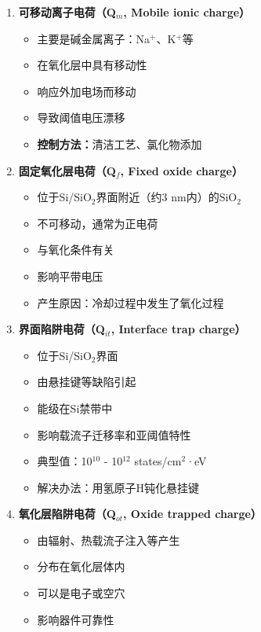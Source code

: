 \documentclass[UTF8,12pt,a4paper]{ctexart}
\begin{document}
\begin{enumerate}
    \item \textbf{可移动离子电荷（Q$_m$, Mobile ionic charge）}
    \begin{itemize}
        \item 主要是碱金属离子：Na$^+$、K$^+$等
        \item 在氧化层中具有移动性
        \item 响应外加电场而移动
        \item 导致阈值电压漂移
        \item \textbf{控制方法：}清洁工艺、氯化物添加
    \end{itemize}
    
    \item \textbf{固定氧化层电荷（Q$_f$, Fixed oxide charge）}
    \begin{itemize}
        \item 位于Si/SiO$_2$界面附近（约3 nm内）的$\text{SiO}_2$
        \item 不可移动，通常为正电荷
        \item 与氧化条件有关
        \item 影响平带电压
        \item 产生原因：冷却过程中发生了氧化过程
    \end{itemize}
    
    \item \textbf{界面陷阱电荷（Q$_{it}$, Interface trap charge）}
    \begin{itemize}
        \item 位于Si/SiO$_2$界面
        \item 由悬挂键等缺陷引起
        \item 能级在Si禁带中
        \item 影响载流子迁移率和亚阈值特性
        \item 典型值：10$^{10}$ - 10$^{12}$ states/cm$^2$·eV
        \item 解决办法：用氢原子H钝化悬挂键
    \end{itemize}
    
    \item \textbf{氧化层陷阱电荷（Q$_{ot}$, Oxide trapped charge）}
    \begin{itemize}
        \item 由辐射、热载流子注入等产生
        \item 分布在氧化层体内
        \item 可以是电子或空穴
        \item 影响器件可靠性
    \end{itemize}
\end{enumerate}
\end{document}
